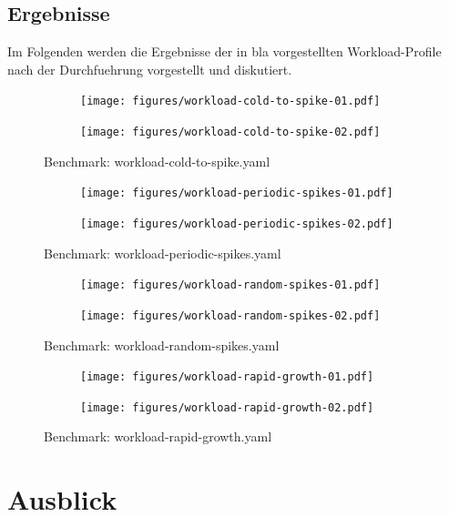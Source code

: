 \documentclass[runningheads]{llncs}
\begin{document}
\subsection{Ergebnisse}

Im Folgenden werden die Ergebnisse der in bla vorgestellten Workload-Profile nach der Durchfuehrung vorgestellt und diskutiert.

\begin{figure}
	\centering
	\begin{subfigure}{.5\textwidth}
		\centering
		\texttt{[image: figures/workload-cold-to-spike-01.pdf]}
		\label{fig:sub1}
	\end{subfigure}%
	\begin{subfigure}{.5\textwidth}
		\centering
		\texttt{[image: figures/workload-cold-to-spike-02.pdf]}
		\label{fig:sub2}
	\end{subfigure}
	\caption{Benchmark: workload-cold-to-spike.yaml}
	\label{fig:test}
\end{figure}	

\begin{figure}
	\centering
	\begin{subfigure}{.5\textwidth}
		\centering
		\texttt{[image: figures/workload-periodic-spikes-01.pdf]}
		\label{fig:sub1}
	\end{subfigure}%
	\begin{subfigure}{.5\textwidth}
		\centering
		\texttt{[image: figures/workload-periodic-spikes-02.pdf]}
		\label{fig:sub2}
	\end{subfigure}
	\caption{Benchmark: workload-periodic-spikes.yaml}
	\label{fig:test}
\end{figure}	


\begin{figure}
	\centering
	\begin{subfigure}{.5\textwidth}
		\centering
		\texttt{[image: figures/workload-random-spikes-01.pdf]}
		\label{fig:sub1}
	\end{subfigure}%
	\begin{subfigure}{.5\textwidth}
		\centering
		\texttt{[image: figures/workload-random-spikes-02.pdf]}
		\label{fig:sub2}
	\end{subfigure}
	\caption{Benchmark: workload-random-spikes.yaml}
	\label{fig:test}
\end{figure}	

\begin{figure}
	\centering
	\begin{subfigure}{.5\textwidth}
		\centering
		\texttt{[image: figures/workload-rapid-growth-01.pdf]}
		\label{fig:sub1}
	\end{subfigure}%
	\begin{subfigure}{.5\textwidth}
		\centering
		\texttt{[image: figures/workload-rapid-growth-02.pdf]}
		\label{fig:sub2}
	\end{subfigure}
	\caption{Benchmark: workload-rapid-growth.yaml}
	\label{fig:test}
\end{figure}	
	
\section{Ausblick}
	
%
%
\newpage


%
\end{document}
